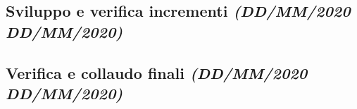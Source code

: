 \documentclass[../piano-di-progetto.tex]{subfiles}
\begin{document}
\subsection[Sviluppo e verifica incrementi]{Sviluppo e verifica incrementi {\normalsize\normalfont\itshape(DD/MM/2020  DD/MM/2020)}}%
\label{sub:sviluppo_e_verifica_incrementi}

\subsection[Verifica e collaudo finali]{Verifica e collaudo finali {\normalsize\normalfont\itshape(DD/MM/2020  DD/MM/2020)}}%
\label{sub:verifica_e_collaudo_finali}

\end{document}

